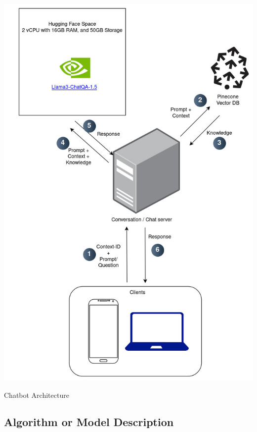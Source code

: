 \begin{center}
    \includegraphics[scale=0.5]{images/chatbot_arch.jpg}
    
    \caption{Chatbot Architecture}
\end{center}

\subsection{Algorithm or Model Description}





